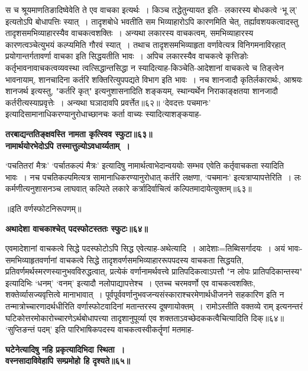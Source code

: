 {{{{ स च श्रूयमाणतिङादिष्वेवेति ते एव वाचका इत्यर्थः~।
किञ्च तद्धेतुन्यायत इति--
 लकारस्य बोधकत्वे `भू ल्' इत्यतोऽपि बोधापत्तिः स्यात्~।
तादृशबोधे भवतीति सम भिव्याहारोऽपि कारणमिति चेत्, तर्ह्यावशयकत्वादस्तु तादृशसमभिव्याहारस्यैव वाचकत्वशक्तिः~।
 अन्यथा लकारस्य वाचकत्वम्, समभिव्याहारस्य कारणत्वञ्चेत्युभयं कल्प्यमिति गौरवं स्यात्~।
तथाच तादृशसमभिव्याहृता वर्णावेत्यत्र विनिगमनाविरहात् प्रयोगान्तर्गतावर्णा वाचका इति सिद्धयतीति भावः~।
 अपिच लकारस्यैव वाचकत्वे कृत्तिङोः कर्तृभावनावाचकत्वव्यवस्था त्वत्सिद्धान्तसिद्धा न स्यादित्याह-किञ्चेति-आदेशानां वाचकत्वे च तिङ्त्वेन भावनायाम्, शानचादिना कर्तरि शक्तिरित्युपपद्यते विभाग इति भावः~।
नच शानजादौ कृतिर्लकारार्थः, आश्रयः शानजर्थ इत्यस्तु, "कर्तरि कृत्" इत्यनुशासनादिति शङ्कयम्, स्थान्यर्थेन निराकाङ्क्षतया शानजादौ कर्तरीत्यस्याप्रवृत्तेः~।
अन्यथा घञादावपि प्रवर्त्तेत॥६२॥
 `देवदत्तः पचमानः' इत्यादिसामानाधिकरण्यानुरोधाच्छानचः कर्ता वाच्यः स्यादित्याशङ्कयाह-
\begin{center}{\bfseries तरबाद्यन्ततिङ्क्षवस्ति नामता कृत्स्विव स्फुटा॥६३॥\\
 नामार्थयोरभेदोऽपि तस्मात्तुल्योऽवधार्य्यताम्~।}\end{center}

 `पचतितरां मैत्रः' `पर्चातकल्पं मैत्रः' इत्यादिषु नामार्थत्वाभेदान्वययोः सम्भव एवेति कर्तृवाचकता स्यादिति भावः~।
नच पचतिकल्पमित्यत्र सामानाधिकरण्यानुरोधात् कर्तरि लक्षणा, `पचमानः' इत्यत्राप्यापत्तेरिति~।
 लः कर्मणीत्यनुशासनञ्च लाघवात् कल्पिते लकारे कर्त्रादिर्वाचित्वं कल्पितमादायेत्युक्तम्॥६३॥
 
 \begin{center}॥इति वर्णस्फोटनिरूपणम्॥\end{center}
\begin{center}{\bfseries अथादेशा वाचकाश्चेत् पदस्फोटस्ततः स्फुटः॥६४॥}\end{center}
 एवमादेशानां वाचकत्वे सिद्धे पदस्फोटोऽपि सिद्ध एवेत्याह-अथेत्यादि~।
आदेशाः=तिब्विसर्गादयः~।
अयं भावः-समभिव्याहृतवर्णानां वाचकत्वे सिद्धे तादृशवर्णसमभिव्याहाररूपपदस्य वाचकता सिद्धयति, प्रतिवर्णमर्थस्मरणस्यानुभवविरुद्धत्वात्, प्रत्येकं वर्णानामर्थवत्त्वे प्रातिपदिकत्वाऽपत्तौ "न लोपः प्रातिपदिकान्तस्य" इत्यादिभिः `धनम्' `वनम्' इत्यादौ नलोपाद्यापत्तेश्च~।
 एतच्च चरमवर्णो एव वाचकत्वशक्तिः, शक्तेर्व्यासज्यवृत्तित्वे मानाभावात्~।
पूर्वपूर्ववर्णानुभवजन्यसंस्काराश्चरमेणार्थधीजनने सहकारिण इति न तन्मात्रोच्चारणादर्थधीरिति वर्णास्फोटवादिनां मतान्तरस्य दूषणायोक्तम्~।
रामोऽस्तीति वक्तव्ये राम् इत्यनन्तरं घटिकोत्तरमोकारोच्चारणेऽर्थबोधापत्त्या तादृशानुपूर्व्या एव शक्तताऽवच्छेदककत्वैचित्यादिति दिक्॥६४॥
 `सुप्तिङन्तं पदम्' इति पारिभाषिकपदस्य वाचकत्वस्वीकर्तॄणां मतमाह-
\begin{center}{\bfseries घटेनेत्यादिषु नहि प्रकृत्यादिभिदा स्थिता~।\\
 वस्नसादाविवेहापि सम्प्रमोहो हि दृश्यते॥६५॥}\end{center}

}}}}
